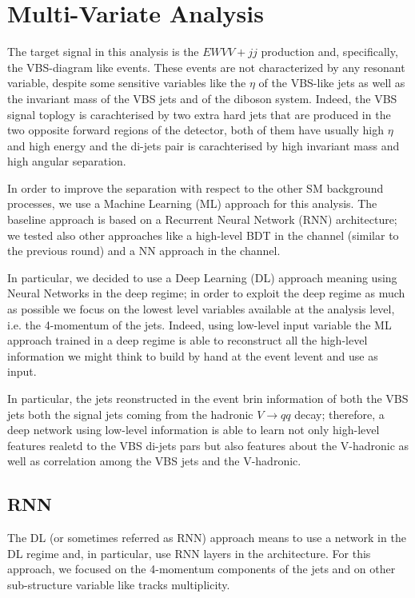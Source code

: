 \chapter{Multi-Variate Analysis}

The target signal in this analysis is the $EW VV+jj$ production and, specifically, the VBS-diagram like events.
These events are not characterized by any resonant variable,
despite some sensitive variables like the $\eta$ of the VBS-like jets as well as
the invariant mass of the VBS jets and of the diboson system.
Indeed, the VBS signal toplogy is carachterised by two extra hard jets that are produced in the two opposite
forward regions of the detector, both of them have usually high $\eta$ and high energy
and the di-jets pair is carachterised by high invariant mass and high angular separation.

In order to improve the separation with respect to the other SM background processes,
we use a Machine Learning (ML) approach for this analysis.
The baseline approach is based on a Recurrent Neural Network (RNN) architecture;
we tested also other approaches like a high-level BDT in the \tlep channel (similar to the previous round)
and a NN approach in the \zlep channel.

In particular, we decided to use a Deep Learning (DL) approach meaning using Neural Networks in the deep regime;
in order to exploit the deep regime as much as possible we focus on the lowest level variables available
at the analysis level, i.e. the 4-momentum of the jets.
Indeed, using low-level input variable the ML approach trained in a deep regime is able to reconstruct all the
high-level information we might think to build by hand at the event levent and use as input.

In particular, the jets reonstructed in the event brin information of both the VBS jets both the signal jets
coming from the hadronic $V \rightarrow qq$ decay; therefore, a deep network using low-level information is able
to learn not only high-level features realetd to the VBS di-jets pars but also features about the V-hadronic
as well as correlation among the VBS jets and the V-hadronic.

\section{RNN}

The DL (or sometimes referred as RNN) approach means to use a network in the DL regime and, in particular, use RNN layers in the architecture. For this approach, we focused on the 4-momentum components of the jets and on other sub-structure variable like tracks multiplicity.

